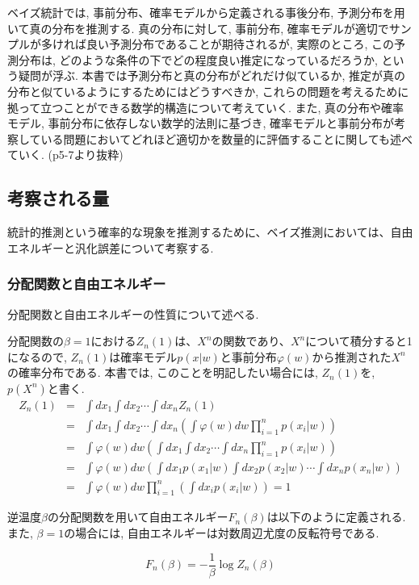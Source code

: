 \documentclass[11pt,a4paper]{jsarticle}
\begin{document}
ベイズ統計では, 事前分布、確率モデルから定義される事後分布, 予測分布を用いて真の分布を推測する. 真の分布に対して, 事前分布, 確率モデルが適切でサンプルが多ければ良い予測分布であることが期待されるが, 実際のところ, この予測分布は, どのような条件の下でどの程度良い推定になっているだろうか, という疑問が浮ぶ. 本書では予測分布と真の分布がどれだけ似ているか, 推定が真の分布と似ているようにするためにはどうすべきか, これらの問題を考えるために拠って立つことができる数学的構造について考えていく. また, 真の分布や確率モデル, 事前分布に依存しない数学的法則に基づき, 確率モデルと事前分布が考察している問題においてどれほど適切かを数量的に評価することに関しても述べていく. (p5-7より抜粋)

\subsection{考察される量}
統計的推測という確率的な現象を推測するために、ベイズ推測においては、自由エネルギーと汎化誤差について考察する.

\subsubsection{分配関数と自由エネルギー}
分配関数と自由エネルギーの性質について述べる.

分配関数の$\beta = 1$における$Z_{n}(1)$は、$X^n$の関数であり、$X^n$について積分すると1になるので, $Z_n(1)$は確率モデル$p(x|w)$と事前分布$\varphi(w)$から推測された$X^n$の確率分布である. 本書では, このことを明記したい場合には, $Z_n(1)$を, $p(X^n)$と書く.
\begin{eqnarray*}
Z_n(1) &=& \int dx_{1} \int dx_{2} \cdots \int dx_{n} Z_n(1)\\
&=& \int dx_{1} \int dx_{2} \cdots \int dx_{n} \left(\int \varphi(w)dw \prod_{i=1}^{n}p(x_i|w)\right) \\
&=& \int \varphi(w)dw \left(\int dx_{1} \int dx_{2} \cdots \int dx_{n}\prod_{i=1}^{n}p(x_i|w)\right)\\
&=& \int \varphi(w)dw \left(\int dx_{1}p(x_1|w) \int dx_{2}p(x_2|w) \cdots \int dx_{n}p(x_n|w)\right)\\
&=& \int \varphi(w)dw \prod_{i=1}^{n} \left(\int dx_i p(x_i|w)\right) = 1
\end{eqnarray*} 

逆温度$\beta$の分配関数を用いて自由エネルギー$F_n(\beta)$は以下のように定義される. また, $\beta = 1$の場合には, 自由エネルギーは対数周辺尤度の反転符号である.

\[ F_n(\beta) = -\frac{1}{\beta}\log Z_n(\beta) \tag{1.13}\]
\end{document}
